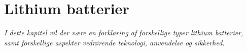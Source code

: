 \chapter{Lithium batterier}\label{kap:lithium}

\emph{I dette kapitel vil der være en forklaring af forskellige typer lithium batterier, samt forskellige aspekter vedrørende teknologi, anvendelse og sikkerhed.}